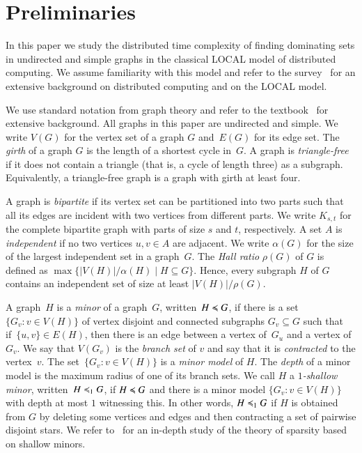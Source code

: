 
\section{Preliminaries}

In this paper we study the distributed time complexity of finding
dominating sets in undirected and simple graphs in the classical
LOCAL model of distributed computing.
We assume familiarity with this model and refer to the survey~\cite{suomela2013survey} for an extensive
background on distributed computing and on the LOCAL model.

We use standard notation from graph theory and refer to the
textbook~\cite{diestel} for extensive background.  All graphs in this
paper are undirected and simple. We write $V(G)$ for the vertex set of
a graph $G$ and~$E(G)$ for its edge set. The \emph{girth} of a graph
$G$ is the length of a shortest cycle in~$G$. A graph is 
\emph{triangle-free} if it does not contain a triangle (that is, a
cycle of length three) as a subgraph. Equivalently, a triangle-free
graph is a graph with  girth at least four.

A graph is \emph{bipartite} if its vertex set can be partitioned into
two parts such that all its edges are incident with two vertices from
different parts. We write $K_{s,t}$ for the complete bipartite
graph with parts of size $s$ and $t$, respectively. A set $A$ is
\emph{independent} if no two vertices $u,v\in A$ are
adjacent. We write $\alpha(G)$ for the size of the largest
independent set in a graph~$G$. The \emph{Hall ratio} $\rho(G)$ of
$G$ is defined as $\max\bigl\{|V(H)|/\alpha(H)\mid H\subseteq G\bigr\}$.
Hence, every subgraph $H$ of $G$ contains an independent set of
size at least $|V(H)|/\rho(G)$.


A graph~$H$ is a \emph{minor} of a
graph~$G$, written~$H\preccurlyeq G$, if there is a set
\mbox{$\{G_v :v\in V(H)\}$} of  vertex disjoint and connected
subgraphs $G_v\subseteq G$ such that if~$\{u,v\}\in E(H)$, then there
is an edge between a vertex of~$G_u$ and a vertex of~$G_v$. We 
say that 
$V(G_v)$ is the \emph{branch set} of $v$ and say that it is
\emph{contracted} to the vertex~$v$. 
The set~\mbox{$\{G_v :v\in V(H)\}$} is a \emph{minor model} of $H$.
The  \emph{depth} of a minor model is the maximum radius of one of its branch sets.
 We call $H$ a \emph{$1$-shallow
  minor}, written~$H\preccurlyeq_1 G$, if $H\preccurlyeq G$ and there is a minor
model \mbox{$\{G_v :v\in V(H)\}$} with depth at most $1$ witnessing this.
In other
words, $H\preccurlyeq_1 G$ if $H$ is obtained from $G$ by deleting some
vertices and edges and then contracting a set of pairwise disjoint
stars. We refer to~\cite{nevsetvril2012sparsity} for an in-depth study
of the theory of sparsity based on shallow minors.

